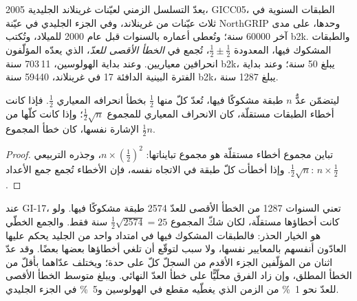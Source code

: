 يعدّ التسلسل الزمني لعيّنات غرينلاند الجليدية 2005، GICC05، الطبقات السنوية في ثلاث عيّنات من غرينلاند،
وفي الجزء الجليدي في عيّنة NorthGRIP وحدها، على مدى آخر \num{60000} سنة؛ وتُعطى أعماره
بالسنوات قبل عام 2000 للميلاد، وتُكتب b2k. والطبقات المشكوك فيها، المعدودة $\frac12 \pm \frac12$،
تُجمع في \emph{الخطأ الأقصى للعدّ}، الذي يعدّه المؤلّفون انحرافين معياريين.
وعند بداية الهولوسين، 11\,703 سنة b2k، يبلغ 50 سنة؛ وعند بداية
الفترة البينية الدافئة 17 في غرينلاند، \num{59440} سنة b2k، يبلغ \num{1287} سنة.

\begin{proposition}\label{prop:b2:climate-proxies:counting}
ليتضمّن عدٌّ $n$ طبقة مشكوكًا فيها، تُعدّ كلّ منها $\frac12$ بخطأ انحرافه
المعياري $\frac12$. فإذا كانت أخطاء الطبقات مستقلّة، كان الانحراف المعياري
للمجموع $\frac12\sqrt{n}$؛ وإذا كانت كلّها من الإشارة نفسها، كان خطأ المجموع
$\frac12 n$.
\end{proposition}

\begin{proof}
تباين مجموع أخطاء مستقلّة هو مجموع تبايناتها: $n \times
(\frac12)^2$، وجذره التربيعي $\frac12\sqrt{n}$. وإذا أخطأت كلّ طبقة في الاتجاه نفسه، فإن
الأخطاء تُجمع جمع الأعداد: $n \times \frac12$.
\end{proof}

عند GI-17، تعني السنوات \num{1287} من الخطأ الأقصى للعدّ \num{2574} طبقة مشكوكًا فيها. ولو كانت
أخطاؤها مستقلّة، لكان شكّ المجموع $\frac12\sqrt{2574} = 25$ سنة فقط.
والجمع الخطّي هو الخيار الحذر: فالطبقات المشكوك فيها في امتداد واحد من الجليد يحكم عليها
العادّون أنفسهم بالمعايير نفسها، ولا سبب لتوقّع أن تلغي أخطاؤها بعضها بعضًا.
وقد عدّ اثنان من المؤلّفين الجزء الأقدم من السجلّ كلّ على حدة؛ ويختلف عدّاهما
بأقلّ من الخطأ المطلق، وإن زاد الفرق محلّيًّا على خطأ العدّ النهائي. ويبلغ
متوسط الخطأ الأقصى للعدّ نحو \qty{1}{\percent} من الزمن الذي يغطّيه مقطع في الهولوسين
و\qty{5}{\percent} في الجزء الجليدي.

